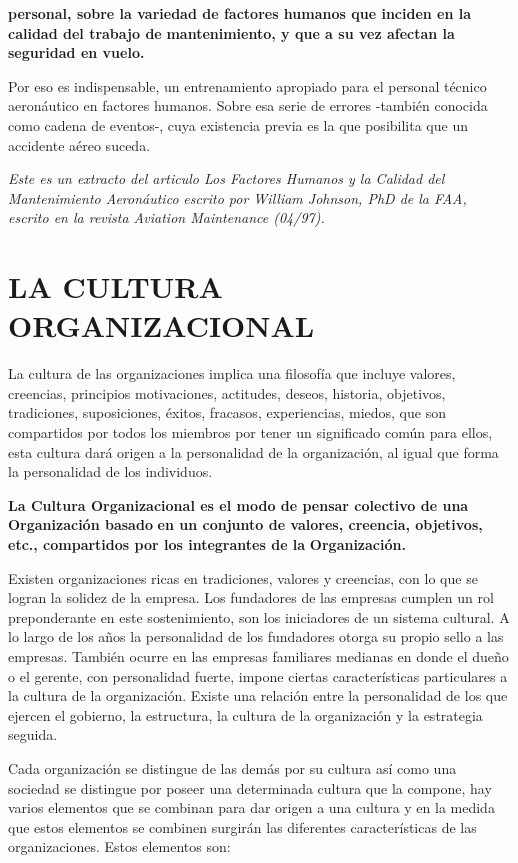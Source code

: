 
\textbf{personal, sobre la variedad de factores humanos que inciden en la calidad del trabajo de} \textbf{mantenimiento, y que a su vez afectan la seguridad en vuelo.}

Por eso es indispensable, un entrenamiento apropiado para el personal técnico aeronáutico en factores humanos. Sobre esa serie de errores -también conocida como cadena de eventos-, cuya existencia previa es la que posibilita que un accidente aéreo suceda.

\textit{Este es un extracto del articulo Los Factores Humanos y la Calidad del Mantenimiento Aeronáutico} \textit{escrito por William Johnson, PhD de la FAA, escrito en la revista Aviation Maintenance (04/97).}

\section*{LA CULTURA ORGANIZACIONAL}
La cultura de las organizaciones implica una filosofía que incluye valores, creencias, principios motivaciones, actitudes, deseos, historia, objetivos, tradiciones, suposiciones, éxitos, fracasos, experiencias, miedos, que son compartidos por todos los miembros por tener un significado común para ellos, esta cultura dará origen a la personalidad de la organización, al igual que forma la personalidad de los individuos.


\begin{recuadro}
\textbf{La Cultura Organizacional es el modo de pensar colectivo de una Organización basado} \textbf{en un conjunto de valores, creencia, objetivos, etc., compartidos por los integrantes de la} \textbf{Organización.}
\end{recuadro}

Existen organizaciones ricas en tradiciones, valores y creencias, con lo que se logran la solidez de la empresa. Los fundadores de las empresas cumplen un rol preponderante en este sostenimiento, son los iniciadores de un sistema cultural. A lo largo de los años la personalidad de los fundadores otorga su propio sello a las empresas. También ocurre en las empresas familiares medianas en donde el dueño o el gerente, con personalidad fuerte, impone ciertas características particulares a la cultura de la organización. Existe una relación entre la personalidad de los que ejercen el gobierno, la estructura, la cultura de la organización y la estrategia seguida.

Cada organización se distingue de las demás por su cultura así como una sociedad se distingue por poseer una determinada cultura que la compone, hay varios elementos que se combinan para dar origen a una cultura y en la medida que estos elementos se combinen surgirán las diferentes características de las organizaciones. Estos elementos son:

